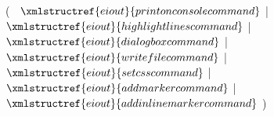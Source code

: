 ( 
$~$ $\xmlstructref{eiout}{printonconsolecommand}$ 
| $\xmlstructref{eiout}{highlightlinescommand}$ 
| $\xmlstructref{eiout}{dialogboxcommand}$ 
| $\xmlstructref{eiout}{writefilecommand}$ 
| $\xmlstructref{eiout}{setcsscommand}$
| $\xmlstructref{eiout}{addmarkercommand}$
| $\xmlstructref{eiout}{addinlinemarkercommand}$
)
